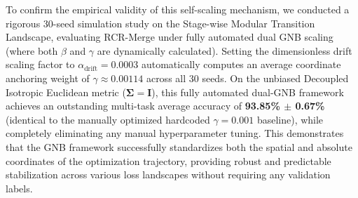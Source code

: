 To confirm the empirical validity of this self-scaling mechanism, we conducted a rigorous 30-seed simulation study on the Stage-wise Modular Transition Landscape, evaluating RCR-Merge under fully automated dual GNB scaling (where both $\beta$ and $\gamma$ are dynamically calculated). Setting the dimensionless drift scaling factor to $\alpha_{\text{drift}} = 0.0003$ automatically computes an average coordinate anchoring weight of $\gamma \approx 0.00114$ across all 30 seeds. On the unbiased Decoupled Isotropic Euclidean metric ($\boldsymbol{\Sigma} = \mathbf{I}$), this fully automated dual-GNB framework achieves an outstanding multi-task average accuracy of \textbf{93.85\% $\pm$ 0.67\%} (identical to the manually optimized hardcoded $\gamma = 0.001$ baseline), while completely eliminating any manual hyperparameter tuning. This demonstrates that the GNB framework successfully standardizes both the spatial and absolute coordinates of the optimization trajectory, providing robust and predictable stabilization across various loss landscapes without requiring any validation labels.

